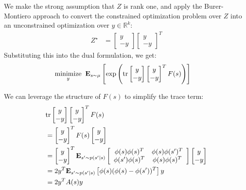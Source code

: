 We make the strong assumption that $Z$ is rank one, and apply the Burer-Montiero approach \citep{burer2003nonlinear} to convert the constrained optimization problem over $Z$ into an unconstrained optimization over $y\in \mathbb R^{k}$:
\begin{align}
  Z^\star & = \begin{bmatrix} y \\ -y \end{bmatrix} \begin{bmatrix} y \\ -y\end{bmatrix}^T
\end{align}
Substituting this into the dual formulation, we get:
\begin{align}
  \underset{y}{\text{minimize}} & \;\; \mathbf{E}_{s\sim\mu} \left [ \exp\left (\text{tr}  \begin{bmatrix} y \\ -y \end{bmatrix} \begin{bmatrix} y \\ -y\end{bmatrix}^T F(s) \right )  \right ]
\end{align}

We can leverage the structure of $F(s)$ to simplify the trace term:
\begin{align}
   & \text{tr}  \begin{bmatrix} y \\ -y \end{bmatrix} \begin{bmatrix} y \\ -y \end{bmatrix}^T F(s)
  \\ & = \begin{bmatrix} y \\ -y \end{bmatrix}^T F(s) \begin{bmatrix} y \\ -y \end{bmatrix}
  \\ & =  \begin{bmatrix} y \\ -y \end{bmatrix}^T  \mathbf{E}_{s' \sim p(s'|s)}  \left[ \begin{array}{cc} \phi(s)\phi(s)^T & \phi(s)\phi(s')^T \\ \phi(s')\phi(s)^T & \phi(s)\phi(s)^T \end{array} \right]
  \begin{bmatrix} y \\ -y \end{bmatrix}
  \\  & =  2 y^T \mathbf{E}_{s' \sim p(s'|s)} \left [\phi(s)(\phi(s)- \phi(s'))^T \right ] y
  \\  & =  2 y^T A(s) y
\end{align}

